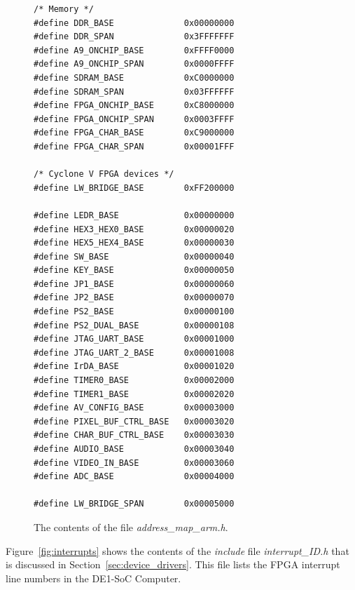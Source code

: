 \documentclass[11pt, twoside, pdftex]{article}
\begin{document}
\lstset{language=C,numbers=none}
\begin{figure}[H]
\begin{center}
\begin{minipage}[t]{16 cm}
\begin{lstlisting}
/* Memory */
#define DDR_BASE              0x00000000
#define DDR_SPAN              0x3FFFFFFF
#define A9_ONCHIP_BASE        0xFFFF0000
#define A9_ONCHIP_SPAN        0x0000FFFF
#define SDRAM_BASE            0xC0000000
#define SDRAM_SPAN            0x03FFFFFF
#define FPGA_ONCHIP_BASE      0xC8000000
#define FPGA_ONCHIP_SPAN      0x0003FFFF
#define FPGA_CHAR_BASE        0xC9000000
#define FPGA_CHAR_SPAN        0x00001FFF

/* Cyclone V FPGA devices */
#define LW_BRIDGE_BASE        0xFF200000

#define LEDR_BASE             0x00000000
#define HEX3_HEX0_BASE        0x00000020
#define HEX5_HEX4_BASE        0x00000030
#define SW_BASE               0x00000040
#define KEY_BASE              0x00000050
#define JP1_BASE              0x00000060
#define JP2_BASE              0x00000070
#define PS2_BASE              0x00000100
#define PS2_DUAL_BASE         0x00000108
#define JTAG_UART_BASE        0x00001000
#define JTAG_UART_2_BASE      0x00001008
#define IrDA_BASE             0x00001020
#define TIMER0_BASE           0x00002000
#define TIMER1_BASE           0x00002020
#define AV_CONFIG_BASE        0x00003000
#define PIXEL_BUF_CTRL_BASE   0x00003020
#define CHAR_BUF_CTRL_BASE    0x00003030
#define AUDIO_BASE            0x00003040
#define VIDEO_IN_BASE         0x00003060
#define ADC_BASE              0x00004000

#define LW_BRIDGE_SPAN        0x00005000
\end{lstlisting}
\end{minipage}
\end{center}
\caption{The contents of the file {\it address\_map\_arm.h}.}
\label{fig:address_map}
\end{figure}

\newpage
Figure~\ref{fig:interrupts} shows the contents of the {\it include} file {\it interrupt\_ID.h}
that is discussed in Section~\ref{sec:device_drivers}. This file lists
the FPGA interrupt line numbers in the DE1-SoC Computer. 
\end{document}
